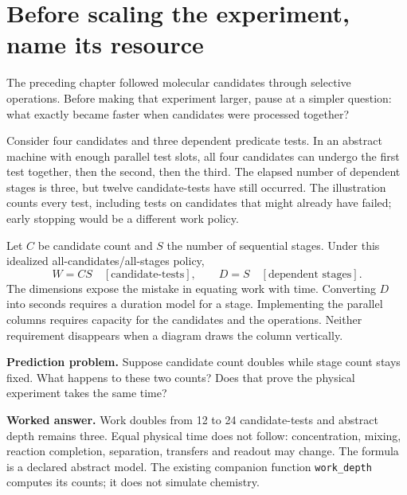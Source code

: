 \section{Before scaling the experiment, name its resource}
The preceding chapter followed molecular candidates through selective
operations. Before making that experiment larger, pause at a simpler question:
what exactly became faster when candidates were processed together?

Consider four candidates and three dependent predicate tests. In an abstract
machine with enough parallel test slots, all four candidates can undergo the
first test together, then the second, then the third. The elapsed number of
dependent stages is three, but twelve candidate-tests have still occurred.
The illustration counts every test, including tests on candidates that might
already have failed; early stopping would be a different work policy.


Let $C$ be candidate count and $S$ the number of sequential stages. Under this
idealized all-candidates/all-stages policy,
\begin{equation}
W=CS\quad[\text{candidate-tests}],\qquad
D=S\quad[\text{dependent stages}].
\end{equation}
The dimensions expose the mistake in equating work with time. Converting
$D$ into seconds requires a duration model for a stage. Implementing the
parallel columns requires capacity for the candidates and the operations.
Neither requirement disappears when a diagram draws the column vertically.

\textbf{Prediction problem.} Suppose candidate count doubles while stage count
stays fixed. What happens to these two counts? Does that prove the physical
experiment takes the same time?

\textbf{Worked answer.} Work doubles from 12 to 24 candidate-tests and abstract
depth remains three. Equal physical time does not follow: concentration,
mixing, reaction completion, separation, transfers and readout may change.
The formula is a declared abstract model. The existing companion function
\texttt{work\_depth} computes its counts; it does not simulate chemistry.

